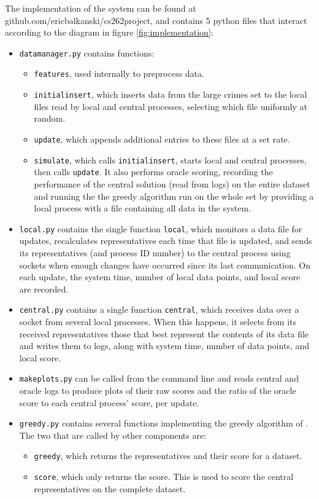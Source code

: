 The implementation of the system can be found at github.com/ericbalkanski/cs262project, and contains 5 python files that interact according to the diagram in figure \ref{fig:implementation}:
\begin{itemize}
    \item \texttt{datamanager.py} contains functions:
    \begin{itemize}
        \item \texttt{features}, used internally to preprocess data.
        \item \texttt{initialinsert}, which inserts data from the large crimes set to the local files read by local and central processes, selecting which file uniformly at random.
        \item \texttt{update}, which appends additional entries to these files at a set rate.
        \item \texttt{simulate}, which calls \texttt{initialinsert}, starts local and central processes, then calls \texttt{update}. It also performs oracle scoring, recording the performance of the central solution (read from logs) on the entire dataset and running the the greedy algorithm run on the whole set by providing a local process with a file containing all data in the system. 
    \end{itemize}
    \item \texttt{local.py} contains the single function \texttt{local}, which monitors a data file for updates, recalculates representatives each time that file is updated, and sends its representatives (and process ID number) to the central process using sockets when enough changes have occurred since its last communication. On each update, the system time, number of local data points, and local score are recorded.
    \item \texttt{central.py} contains a single function \texttt{central}, which receives data over a socket from several local processes. When this happens, it selects from its received representatives those that best represent the contents of its data file and writes them to logs, along with system time, number of data points, and local score.
    \item \texttt{makeplots.py} can be called from the command line and reads central and oracle logs to produce plots of their raw scores and the ratio of the oracle score to each central process' score, per update.
    \item \texttt{greedy.py} contains several functions implementing the greedy algorithm of \citet{mirzasoleiman2013distributed}. The two that are called by other components are:
    \begin{itemize}
        \item \texttt{greedy}, which returns the representatives and their score for a dataset.
        \item \texttt{score}, which only returns the score. This is used to score the central representatives on the complete dataset.
    \end{itemize}
\end{itemize}


